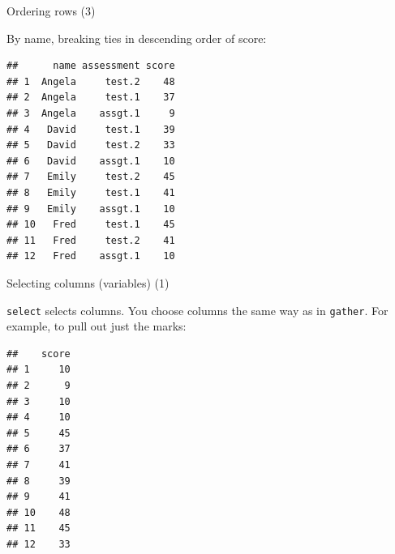 \begin{frame}[fragile]{Ordering rows (3)}
  
By name, breaking ties in descending order of score:

{\small
\begin{knitrout}
\color{fgcolor}\begin{kframe}
\begin{alltt}
\end{alltt}
\begin{verbatim}
##      name assessment score
## 1  Angela     test.2    48
## 2  Angela     test.1    37
## 3  Angela    assgt.1     9
## 4   David     test.1    39
## 5   David     test.2    33
## 6   David    assgt.1    10
## 7   Emily     test.2    45
## 8   Emily     test.1    41
## 9   Emily    assgt.1    10
## 10   Fred     test.1    45
## 11   Fred     test.2    41
## 12   Fred    assgt.1    10
\end{verbatim}
\end{kframe}
\end{knitrout}
}
  
\end{frame}

\begin{frame}[fragile]{Selecting columns (variables) (1)}

  \texttt{select} selects columns. You choose columns the same way as
  in \texttt{gather}.
  For
  example, to pull out just the marks:
  
\begin{knitrout}
\color{fgcolor}\begin{kframe}
\begin{alltt}
\end{alltt}
\begin{verbatim}
##    score
## 1     10
## 2      9
## 3     10
## 4     10
## 5     45
## 6     37
## 7     41
## 8     39
## 9     41
## 10    48
## 11    45
## 12    33
\end{verbatim}
\end{kframe}
\end{knitrout}
  
\end{frame}

